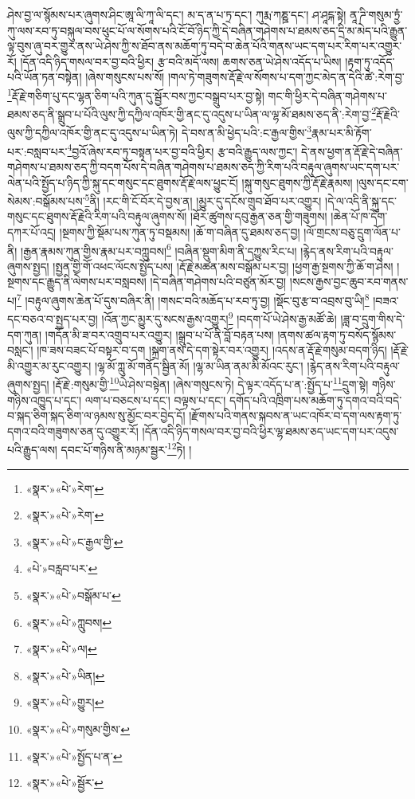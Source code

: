 ཤེས་བྱ་ལ་སྙོམས་པར་ཞུགས་ཤིང་ཨཱ་ལི་ཀཱ་ལི་དང་། མ་ད་ན་པ་ཏྲ་དང་། ཀུརྨ་ཀཎྛ་དང་། ཤ་ཤཱངྐ་སྟེ། ནཱ་ཌི་གསུམ་ཏྲྱཾ་ཀུ་ལས་རབ་ཏུ་བསྐུལ་བས་ཕུང་པོ་ལ་སོགས་པའི་ངོ་བོ་ཉིད་ཀྱི་དེ་བཞིན་གཤེགས་པ་ཐམས་ཅད་དྲི་མ་མེད་པའི་རྒྱུན་ལྟ་བུས་ཞུ་བར་གྱུར་ནས་ཡེ་ཤེས་ཀྱི་ས་ཐོབ་ནས་མཆོག་ཏུ་བདེ་བ་ཆེན་པོའི་གནས་ཡང་དག་པར་རིག་པར་འགྱུར་རོ། །དོན་འདི་ཉིད་གསལ་བར་བྱ་བའི་ཕྱིར། རྩ་བའི་མདོ་ལས། ཆགས་ཅན་ཡེ་ཤེས་འདོད་པ་ཡིས། །རྟག་ཏུ་འདོད་པའི་ཡོན་ཏན་བསྟེན། །ཞེས་གསུངས་པས་སོ། །གལ་ཏེ་གཟུགས་རྡོ་རྗེ་ལ་སོགས་པ་དག་ཀྱང་མེད་ན་དེའི་ཚེ་:རེག་བྱ་\footnote{«སྣར་»«པེ་»རེག་}རྡོ་རྗེ་གཅིག་པུ་དང་ལྷན་ཅིག་པའི་ཀུན་དུ་སྦྱོར་བས་ཀྱང་བསྒྲུབ་པར་བྱ་སྟེ། གང་གི་ཕྱིར་དེ་བཞིན་གཤེགས་པ་ཐམས་ཅད་ནི་སྒྲུབ་པ་པོའི་ལུས་ཀྱི་དཀྱིལ་འཁོར་གྱི་ནང་དུ་འདུས་པ་ཡིན་ལ་ལྷ་མོ་ཐམས་ཅད་ནི་:རེག་བྱ་\footnote{«སྣར་»«པེ་»རེག་}རྡོ་རྗེའི་ལུས་ཀྱི་དཀྱིལ་འཁོར་གྱི་ནང་དུ་འདུས་པ་ཡིན་ཏེ། དེ་བས་ན་མི་ཕྱེད་པའི་:ང་རྒྱལ་གྱིས་\footnote{«སྣར་»«པེ་»ང་རྒྱལ་གྱི་}རྣམ་པར་མི་རྟོག་པར་:བསླབ་པར་\footnote{«པེ་»བརླབ་པར་}བྱའོ་ཞེས་རབ་ཏུ་བསྟན་པར་བྱ་བའི་ཕྱིར། རྩ་བའི་རྒྱུད་ལས་ཀྱང་། དེ་ནས་ཕྱག་ན་རྡོ་རྗེ་དེ་བཞིན་གཤེགས་པ་ཐམས་ཅད་ཀྱི་བདག་པོས་དེ་བཞིན་གཤེགས་པ་ཐམས་ཅད་ཀྱི་རིག་པའི་བརྟུལ་ཞུགས་ཡང་དག་པར་ལེན་པའི་སྤྱོད་པ་ཉིད་ཀྱི་སྐུ་དང་གསུང་དང་ཐུགས་རྡོ་རྗེ་ལས་ཕྱུང་ངོ། །སྐུ་གསུང་ཐུགས་ཀྱི་རྡོ་རྗེ་རྣམས། །ལུས་དང་ངག་སེམས་:བསྒོམས་པས་\footnote{«སྣར་»«པེ་»བསྒོམ་པ་}ནི། །རང་གི་ངོ་བོར་དེ་བྱས་ན། །མྱུར་དུ་དངོས་གྲུབ་ཐོབ་པར་འགྱུར། །དེ་ལ་འདི་ནི་སྐུ་དང་གསུང་དང་ཐུགས་རྡོ་རྗེའི་རིག་པའི་བརྟུལ་ཞུགས་སོ། །ཐོར་ཚུགས་དབུ་རྒྱན་ཅན་གྱི་གཟུགས། །ཆེན་པོ་ཁ་དོག་དཀར་པོ་འདྲ། །སྔགས་ཀྱི་སྡོམ་པས་ཀུན་ཏུ་བསྡམས། །ཆོ་ག་བཞིན་དུ་ཐམས་ཅད་བྱ། །ལོ་གྲངས་བཅུ་དྲུག་ལོན་པ་ནི། །རྒྱན་རྣམས་ཀུན་གྱིས་རྣམ་པར་བཀླུབས།\footnote{«སྣར་»«པེ་»ཀླུབས།} །བཞིན་སྡུག་མིག་ནི་དཀྱུས་རིང་པ། །རྙེད་ནས་རིག་པའི་བརྟུལ་ཞུགས་སྤྱད། །སྤྱན་གྱི་གོ་འཕང་ལོངས་སྤྱོད་པས། །རྡོ་རྗེ་མཚན་མས་བསྒོམ་པར་བྱ། །ཕྱག་རྒྱ་སྔགས་ཀྱི་ཆོ་ག་ཤེས། །སྔགས་དང་རྒྱུད་ནི་ལེགས་པར་བསླབས། །དེ་བཞིན་གཤེགས་པའི་བཙུན་མོར་བྱ། །སངས་རྒྱས་བྱང་ཆུབ་རབ་གནས་པ།\footnote{«སྣར་»«པེ་»ལ།} །བརྟུལ་ཞུགས་ཆེན་པོ་དུས་བཞིར་ནི། །གསང་བའི་མཆོད་པ་རབ་ཏུ་བྱ། །སྡོང་བུ་རྩ་བ་འབྲས་བུ་ཡི།\footnote{«སྣར་»«པེ་»ཡིན།} །བཟའ་དང་བཅའ་བ་སྤྱད་པར་བྱ། །འོན་ཀྱང་མྱུར་དུ་སངས་རྒྱས་འགྱུར།\footnote{«སྣར་»«པེ་»གྱུར།} །བདག་པོ་ཡེ་ཤེས་རྒྱ་མཚོ་ཆེ། །ཟླ་བ་དྲུག་གིས་དེ་དག་ཀུན། །གདོན་མི་ཟ་བར་འགྲུབ་པར་འགྱུར། །སྒྲུབ་པ་པོ་ནི་བློ་བརྟན་པས། །ནགས་ཚལ་རྟག་ཏུ་བསོད་སྙོམས་བསླང་། །ཁ་ཟས་བཟང་པོ་བསྟར་བ་དག །སྐྲག་ནས་དེ་དག་སྟེར་བར་འགྱུར། །འདས་ན་རྡོ་རྗེ་གསུམ་བདག་ཉིད། །རྡོ་རྗེ་མི་འགྱུར་མ་རུང་འགྱུར། །ལྷ་མོ་ཀླུ་མོ་གནོད་སྦྱིན་མོ། །ལྷ་མ་ཡིན་ནམ་མི་མོའང་རུང་། །རྙེད་ནས་རིག་པའི་བརྟུལ་ཞུགས་སྤྱད། །རྡོ་རྗེ་:གསུམ་གྱི་\footnote{«སྣར་»«པེ་»གསུམ་གྱིས་}ཡེ་ཤེས་བསྟེན། །ཞེས་གསུངས་ཏེ། དེ་ལྟར་འདོད་པ་ན་:སྤྱོད་པ་\footnote{«སྣར་»«པེ་»སྤྱོད་པ་ན་}དྲུག་སྟེ། གཉིས་གཉིས་འཁྱུད་པ་དང་། ལག་པ་བཅངས་པ་དང་། བལྟས་པ་དང་། དགོད་པའི་འཁྲིག་པས་མཆོག་ཏུ་དགའ་བའི་བདེ་བ་སྐད་ཅིག་སྐད་ཅིག་ལ་ཉམས་སུ་མྱོང་བར་བྱེད་དོ། །རྫོགས་པའི་གནས་སྐབས་ན་ཡང་འཁོར་བ་དག་ལས་རྟག་ཏུ་དགའ་བའི་གཟུགས་ཅན་དུ་འགྱུར་རོ། །དོན་འདི་ཉིད་གསལ་བར་བྱ་བའི་ཕྱིར་ལྷ་ཐམས་ཅད་ཡང་དག་པར་འདུས་པའི་རྒྱུད་ལས། དབང་པོ་གཉིས་ནི་མཉམ་སྦྱར་\footnote{«སྣར་»«པེ་»སྦྱོར་}ཏེ། །
